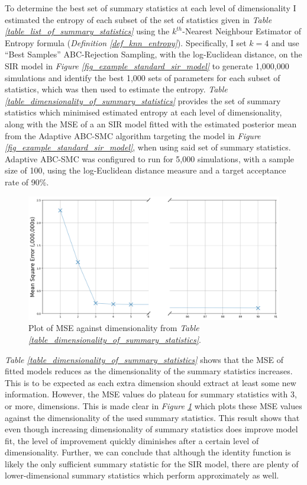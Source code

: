 \documentclass[11pt,a4paper]{article}
\theoremstyle{break}
\begin{document}
  \par To determine the best set of summary statistics at each level of dimensionality I estimated the entropy of each subset of the set of statistics given in \textit{Table \ref{table_list_of_summary_statistics}} using the $k^{th}$-Nearest Neighbour Estimator of Entropy formula (\textit{Definition \ref{def_knn_entropy}}). Specifically, I set $k=4$ and use ``Best Samples'' ABC-Rejection Sampling, with the log-Euclidean distance, on the SIR model in \textit{Figure \ref{fig_example_standard_sir_model}} to generate 1,000,000 simulations and identify the best 1,000 sets of parameters for each subset of statistics, which was then used to estimate the entropy. \textit{Table \ref{table_dimensionality_of_summary_statistics}} provides the set of summary statistics which minimised estimated entropy at each level of dimensionality, along with the MSE of a an SIR model fitted with the estimated posterior mean from the Adaptive ABC-SMC algorithm targeting the model in \textit{Figure \ref{fig_example_standard_sir_model}}, when using said set of summary statistics. Adaptive ABC-SMC was configured to run for 5,000 simulations, with a sample size of 100, using the log-Euclidean distance measure and a target acceptance rate of 90\%.

  \begin{figure}[H]
    \centering\includegraphics[width=.7\textwidth]{mse_by_dimensionality.PNG}
    \caption{Plot of MSE against dimensionality from \textit{Table \ref{table_dimensionality_of_summary_statistics}}.}
    \label{fig_mse_by_dimensionality}
  \end{figure}

  \par \textit{Table \ref{table_dimensionality_of_summary_statistics}} shows that the MSE of fitted models reduces as the dimensionality of the summary statistics increases. This is to be expected as each extra dimension should extract at least some new information. However, the MSE values do plateau for summary statistics with 3, or more, dimensions. This is made clear in \textit{Figure \ref{fig_mse_by_dimensionality}} which plots these MSE values against the dimensionality of the used summary statistics. This result shows that even though increasing dimensionality of summary statistics does improve model fit, the level of improvement quickly diminishes after a certain level of dimensionality. Further, we can conclude that although the identity function is likely the only sufficient summary statistic for the SIR model, there are plenty of lower-dimensional summary statistics which perform approximately as well.
\end{document}
